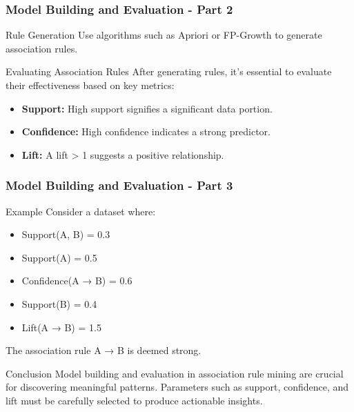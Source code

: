 \documentclass{beamer}
\begin{document}
\begin{frame}[fragile]
    \frametitle{Model Building and Evaluation - Part 2}

    \begin{block}{Rule Generation}
        Use algorithms such as Apriori or FP-Growth to generate association rules.
    \end{block}

    \begin{block}{Evaluating Association Rules}
        After generating rules, it's essential to evaluate their effectiveness based on key metrics:
    \end{block}

    \begin{itemize}
        \item \textbf{Support:} High support signifies a significant data portion.
        \item \textbf{Confidence:} High confidence indicates a strong predictor.
        \item \textbf{Lift:} A lift > 1 suggests a positive relationship.
    \end{itemize}
\end{frame}

\begin{frame}[fragile]
    \frametitle{Model Building and Evaluation - Part 3}

    \begin{block}{Example}
        Consider a dataset where:
        \begin{itemize}
            \item Support(A, B) = 0.3
            \item Support(A) = 0.5
            \item Confidence(A → B) = 0.6
            \item Support(B) = 0.4
            \item Lift(A → B) = 1.5
        \end{itemize}
        The association rule A → B is deemed strong.
    \end{block}

    \begin{block}{Conclusion}
        Model building and evaluation in association rule mining are crucial for discovering meaningful patterns. Parameters such as support, confidence, and lift must be carefully selected to produce actionable insights.
    \end{block}
\end{frame}
\end{document}
